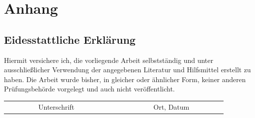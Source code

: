 \documentclass[a4paper,11pt,singlespacing]{article}
\begin{document}
\section*{Anhang}\label{Anhang}
%

%
\begin{newpage}
\vspace*{\fill}
\section*{Eidesstattliche Erklärung}\label{sec:Eidesstattliche Erklärung}
	Hiermit versichere ich, die vorliegende Arbeit selbstständig und unter ausschließlicher Verwendung der angegebenen Literatur und Hilfsmittel erstellt zu haben. Die Arbeit wurde bisher, in gleicher oder ähnlicher Form, keiner anderen Prüfungsbehörde vorgelegt und auch nicht veröffentlicht.\\

\vspace{3cm}
\begin{tabular*}{\textwidth}{c@{\extracolsep\fill}cc}
\cline{1-1}
\cline{3-3}
\\
\ \ \ \ \ \ \ \ \ Unterschrift\ \ \ \ \ \ \ \ \ \ & & \ \ \ \ \ \ \ \ \ Ort, Datum\ \ \ \ \ \ \ \ \ \\
\end{tabular*}
\end{newpage}
\end{document}
